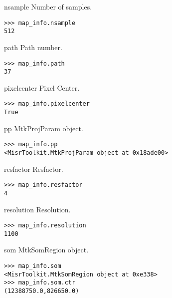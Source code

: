 \documentclass{howto}
\begin{document}
\begin{memberdesc}[int]{nsample}
  Number of samples.

\begin{verbatim}
>>> map_info.nsample
512
\end{verbatim}
\end{memberdesc}

\begin{memberdesc}[int]{path}
  Path number.
  
\begin{verbatim}
>>> map_info.path   
37
\end{verbatim}
\end{memberdesc}

\begin{memberdesc}[PyBool]{pixelcenter}
  Pixel Center.

\begin{verbatim}
>>> map_info.pixelcenter
True
\end{verbatim}
\end{memberdesc}

\begin{memberdesc}[MtkProjParam]{pp}
  MtkProjParam object.

\begin{verbatim}
>>> map_info.pp         
<MisrToolkit.MtkProjParam object at 0x18ade00>
\end{verbatim}
\end{memberdesc}

\begin{memberdesc}[int]{resfactor}
  Resfactor.

\begin{verbatim}
>>> map_info.resfactor
4
\end{verbatim}
\end{memberdesc}

\begin{memberdesc}[int]{resolution}
  Resolution.

\begin{verbatim}
>>> map_info.resolution
1100
\end{verbatim}
\end{memberdesc}

\begin{memberdesc}[MtkSomRegion]{som}
  MtkSomRegion object.

\begin{verbatim}
>>> map_info.som       
<MisrToolkit.MtkSomRegion object at 0xe338>
>>> map_info.som.ctr
(12388750.0,826650.0)
\end{verbatim}
\end{memberdesc}
\end{document}
